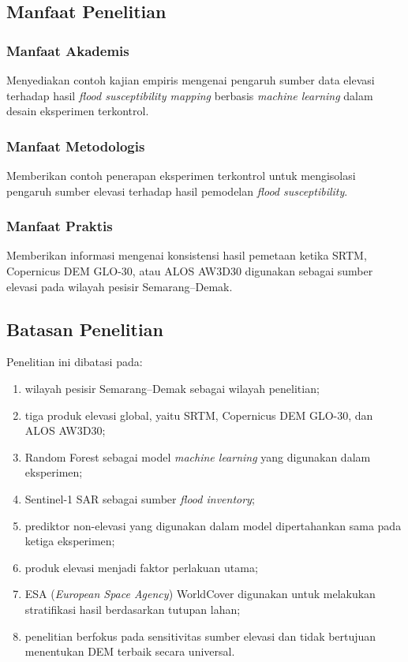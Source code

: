 \documentclass[12pt]{article}
\begin{document}
\subsection{Manfaat Penelitian}

\subsubsection{Manfaat Akademis}

Menyediakan contoh kajian empiris mengenai pengaruh sumber data elevasi
terhadap hasil \textit{flood susceptibility mapping} berbasis \textit{machine
learning} dalam desain eksperimen terkontrol.

\subsubsection{Manfaat Metodologis}

Memberikan contoh penerapan eksperimen terkontrol untuk mengisolasi pengaruh
sumber elevasi terhadap hasil pemodelan \textit{flood susceptibility}.

\subsubsection{Manfaat Praktis}

Memberikan informasi mengenai konsistensi hasil pemetaan ketika SRTM,
Copernicus DEM GLO-30, atau ALOS AW3D30 digunakan sebagai sumber elevasi pada
wilayah pesisir Semarang--Demak.

\subsection{Batasan Penelitian}

Penelitian ini dibatasi pada:

\begin{enumerate}
\item wilayah pesisir Semarang--Demak sebagai wilayah penelitian;
\item tiga produk elevasi global, yaitu SRTM, Copernicus DEM GLO-30, dan
ALOS AW3D30;
\item Random Forest sebagai model \textit{machine learning} yang digunakan
dalam eksperimen;
\item Sentinel-1 SAR sebagai sumber \textit{flood inventory};
\item prediktor non-elevasi yang digunakan dalam model dipertahankan sama
pada ketiga eksperimen;
\item produk elevasi menjadi faktor perlakuan utama;
\item ESA (\textit{European Space Agency}) WorldCover digunakan untuk
melakukan stratifikasi hasil berdasarkan tutupan lahan;
\item penelitian berfokus pada sensitivitas sumber elevasi dan tidak
bertujuan menentukan DEM terbaik secara universal.
\end{enumerate}
\end{document}
